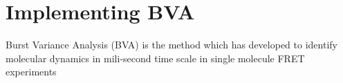 \section{Implementing BVA}


Burst Variance Analysis (BVA) is the method which has developed to identify molecular dynamics in mili-second time scale in single molecule FRET experiments~\cite{Torella_2011}